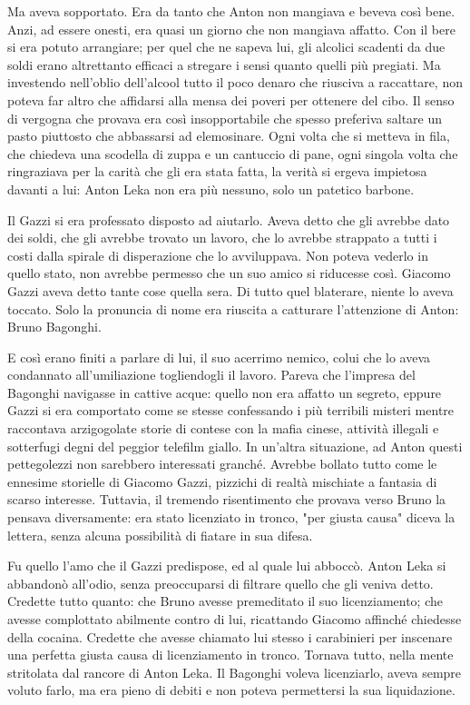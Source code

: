 Ma aveva sopportato. Era da tanto che Anton non mangiava e beveva così bene. Anzi, ad essere onesti, era quasi un giorno che non mangiava affatto. Con il bere si era potuto arrangiare; per quel che ne sapeva lui, gli alcolici scadenti da due soldi erano altrettanto efficaci a stregare i sensi quanto quelli più pregiati. Ma investendo nell'oblio dell'alcool tutto il poco denaro che riusciva a raccattare, non poteva far altro che affidarsi alla mensa dei poveri per ottenere del cibo. Il senso di vergogna che provava era così insopportabile che spesso preferiva saltare un pasto piuttosto che abbassarsi ad elemosinare. Ogni volta che si metteva in fila, che chiedeva una scodella di zuppa e un cantuccio di pane, ogni singola volta che ringraziava per la carità che gli era stata fatta, la verità si ergeva impietosa davanti a lui: Anton Leka non era più nessuno, solo un patetico barbone.

Il Gazzi si era professato disposto ad aiutarlo. Aveva detto che gli avrebbe dato dei soldi, che gli avrebbe trovato un lavoro, che lo avrebbe strappato a tutti i costi dalla spirale di disperazione che lo avviluppava. Non poteva vederlo in quello stato, non avrebbe permesso che un suo amico si riducesse così. Giacomo Gazzi aveva detto tante cose quella sera. Di tutto quel blaterare, niente lo aveva toccato. Solo la pronuncia di nome era riuscita a catturare l'attenzione di Anton: Bruno Bagonghi.

E così erano finiti a parlare di lui, il suo acerrimo nemico, colui che lo aveva condannato all'umiliazione togliendogli il lavoro. Pareva che l'impresa del Bagonghi navigasse in cattive acque: quello non era affatto un segreto, eppure Gazzi si era comportato come se stesse confessando i più terribili misteri mentre raccontava arzigogolate storie di contese con la mafia cinese, attività illegali e sotterfugi degni del peggior telefilm giallo. In un'altra situazione, ad Anton questi pettegolezzi non sarebbero interessati granché. Avrebbe bollato tutto come le ennesime storielle di Giacomo Gazzi, pizzichi di realtà mischiate a fantasia di scarso interesse. Tuttavia, il tremendo risentimento che provava verso Bruno la pensava diversamente: era stato licenziato in tronco, "per giusta causa" diceva la lettera, senza alcuna possibilità di fiatare in sua difesa.

Fu quello l'amo che il Gazzi predispose, ed al quale lui abboccò. Anton Leka si abbandonò all'odio, senza preoccuparsi di filtrare quello che gli veniva detto. Credette tutto quanto: che Bruno avesse premeditato il suo licenziamento; che avesse complottato abilmente contro di lui, ricattando Giacomo affinché chiedesse della cocaina. Credette che avesse chiamato lui stesso i carabinieri per inscenare una perfetta giusta causa di licenziamento in tronco. Tornava tutto, nella mente stritolata dal rancore di Anton Leka. Il Bagonghi voleva licenziarlo, aveva sempre voluto farlo, ma era pieno di debiti e non poteva permettersi la sua liquidazione. 

